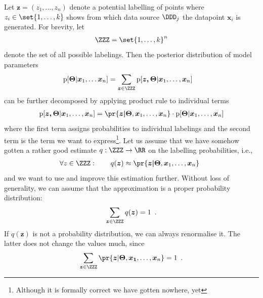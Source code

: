\documentclass{article}
\renewcommand{\vec}[1]{\boldsymbol{#1}}
\newcommand{\pd}[1]{\mathrm{p}[#1]}
\begin{document}
Let $\vec{z}=(z_1,\ldots,z_n)$ denote a potential labelling of points where $z_i\in\set{1,\ldots,k}$ shows from which data source $\DDD_j$ the datapoint $\vec{x}_i$ is generated. For brevity, let 
\begin{align*}
\ZZZ=\set{1,\ldots,k}^n
\end{align*} 
denote the set of all possible labelings. Then the posterior distribution of model parameters     
\begin{align}\label{eq:posterior}
\pd{\vec{\Theta}|\vec{x}_1,\ldots\vec{x}_n}&=\sum_{\vec{z}\in\ZZZ}\pd{\vec{\vec{z},\Theta}|\vec{x}_1,\ldots,\vec{x}_n}
\end{align}
can be further decomposed by applying product rule to individual terms 
\begin{align*}
\pd{\vec{\vec{z},\Theta}|\vec{x}_1,\ldots,\vec{x}_n} = %
\pr{\vec{\vec{z}|\Theta},\vec{x}_1,\ldots,\vec{x}_n}\cdot
\pd{\vec{\Theta}|\vec{x}_1,\ldots,\vec{x}_n}  
\end{align*}
where the first term assigns probabilities to individual labelings and the second term is the term we want to express\footnote{Although it is formally correct we have gotten nowhere, yet}. Let us assume that we have somehow gotten a rather good estimate $q: \ZZZ\to \RR$ on the labelling probabilities, i.e.,
\begin{align*}
\forall z\in\ZZZ:\qquad q(\vec{z})\approx \pr{\vec{\vec{z}|\Theta},\vec{x}_1,\ldots,\vec{x}_n}\enspace 
\end{align*} 
and we want to use and improve this estimation further. Without loss of generality, we can assume that the approximation is a proper probability distribution: 
\begin{align}\label{eq:z-normalisation}
 \sum_{\vec{z}\in\ZZZ}q(\vec{z})=1\enspace.
\end{align}
If $q(\vec{z})$ is not a probability distribution, we can always renormalise it. The latter does not change the values much, since   
\begin{align*}
 \sum_{\vec{z}\in\ZZZ}\pr{\vec{z}|\vec{\Theta},\vec{x_1},\ldots,\vec{x}_n}=1\enspace.
\end{align*}
\end{document}

